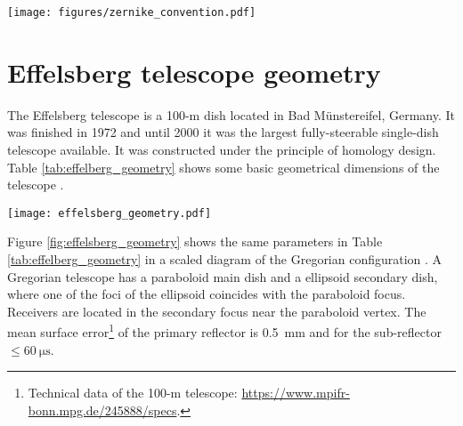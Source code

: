 \documentclass[
    ]
    {aa}
\begin{document}
\begin{appendix}
        \begin{figure*}
            \centering
            \texttt{[image: figures/zernike\_convention.pdf]}
            \caption{Zernike circle polynomials. This is the polynomial and naming convention used in all the presented analysis. Largest amplitude values are yellow and lower are purple. Amplitudes oscillate between one and minus one. The Zernike circle polynomials $U^\ell_n(\varrho, \vartheta)$ are up to a radial order of $n=5$, i.e., 21 polynomials.} 
            \label{fig:zernike_convention}
        \end{figure*}

        \section{Effelsberg telescope geometry}
        \label{ap:effelsberg_telescope_geometry}
        The Effelsberg telescope is a 100-m dish located in Bad M\"{u}nstereifel, Germany. It was finished in 1972 and until 2000 it was the largest fully-steerable single-dish telescope available. It was constructed under the principle of homology design. Table \ref{tab:effelberg_geometry} shows some basic geometrical dimensions of the telescope \citep{2014JGeod..88.1145A}.

        \begin{figure*}
            \centering
            \texttt{[image: effelsberg\_geometry.pdf]}
            \caption{Effelsberg Gregorian telescope. Left: cross section $x_fz_f$-plane  primary reflector (parabola) and sub-reflector (ellipse). Right: aperture plane or $x_fy_f$-plane projection, the dashed area corresponds to the support struts and the sub-reflector (part of the blockage distribution, see Figure \ref{fig:blockage}), see Table \ref{tab:effelberg_geometry}. The receiver or feed antenna is placed in the secondary focus near the paraboloid vertex $V_\text{p}$.}
            \label{fig:effelsberg_geometry}
        \end{figure*}

        Figure \ref{fig:effelsberg_geometry} shows the same parameters in Table \ref{tab:effelberg_geometry} in a scaled diagram of the Gregorian configuration \citep{1961ITAP....9..140H}. A Gregorian telescope has a paraboloid main dish and a ellipsoid secondary dish, where one of the foci of the ellipsoid coincides with the paraboloid focus. Receivers are located in the secondary focus near the paraboloid vertex. The mean surface error\footnote{Technical data of the 100-m telescope: \url{https://www.mpifr-bonn.mpg.de/245888/specs}.} of the primary reflector is \SI{0.5}{\milli\m} and for the sub-reflector $\leq\SI{60}{\micro\s}$.


\end{appendix}
\end{document}
